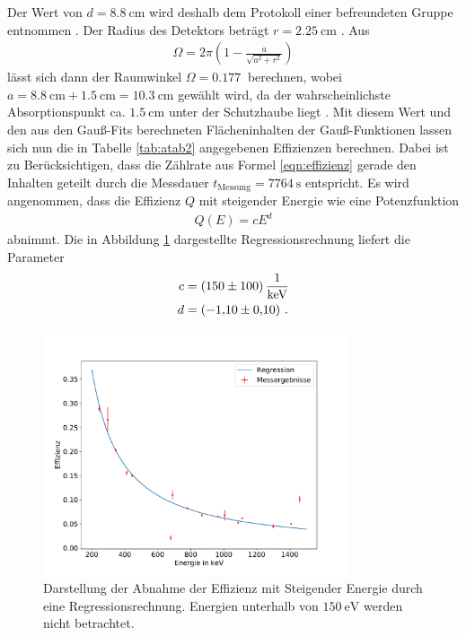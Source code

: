 Der Wert von $d=\SI{8.8}{\centi\meter}$ wird deshalb dem Protokoll einer befreundeten Gruppe entnommen \cite{abstand}.
Der Radius des Detektors beträgt $r=\SI{2.25}{\centi\meter}$ \cite{sample}.
Aus
\begin{align}
\Omega=2\pi\left( 1- \frac{a}{\sqrt{a^2+r^2}}\right)
\end{align}
lässt sich dann der Raumwinkel $\Omega=\SI{0.177}{}$ berechnen, wobei $a=\SI{8.8}{\centi\meter}+\SI{1.5}{\centi\meter}=\SI{10.3}{\centi\meter}$ gewählt wird, da der wahrscheinlichste Absorptionspunkt ca. $\SI{1.5}{\centi\meter}$ unter der Schutzhaube liegt \cite{sample}.
Mit diesem Wert und den aus den Gauß-Fits berechneten Flächeninhalten der Gauß-Funktionen lassen sich nun die in Tabelle \ref{tab:atab2} angegebenen Effizienzen berechnen.
Dabei ist zu Berücksichtigen, dass die Zählrate aus Formel \ref{eqn:effizienz} gerade den Inhalten geteilt durch die Messdauer $t_\text{Messung}=\SI{7764}{\second}$ entspricht.
Es wird angenommen, dass die Effizienz $Q$ mit steigender Energie wie eine Potenzfunktion
\begin{align}
Q(E)=c E^{d}
\end{align}
abnimmt.
Die in Abbildung \ref{fig:Effizienz} dargestellte Regressionsrechnung liefert die Parameter
\begin{align*}
c&=\SI{150+-100}{\per\kilo\electronvolt}\\
d&=\SI{-1.10+-0.1}{}\text{ .}
\end{align*}
\begin{figure}
\centering
\includegraphics[width=0.8\textwidth]{python/plots/effizienz.pdf}
\caption{Darstellung der Abnahme der Effizienz mit Steigender Energie durch eine Regressionsrechnung. Energien unterhalb von $\SI{150}{\electronvolt}$ werden nicht betrachtet.}
\label{fig:Effizienz}
\end{figure}

